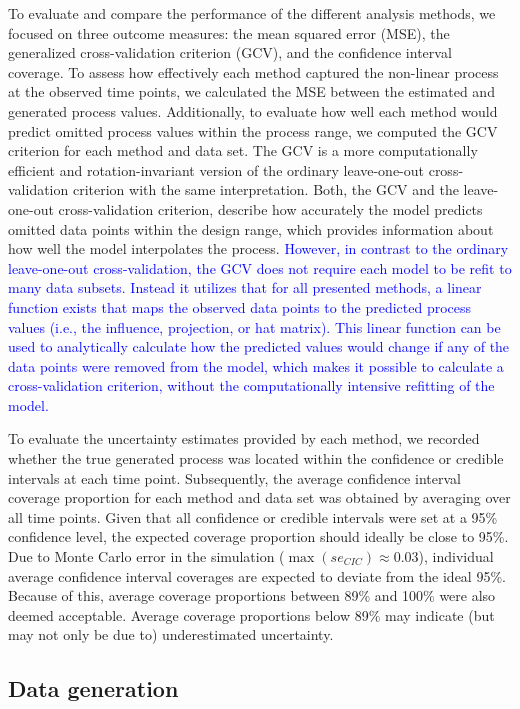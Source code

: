 \documentclass[man, floatsintext]{apa7}
\begin{document}
To evaluate and compare the performance of the different analysis methods, we
focused on three outcome measures: the mean squared error (MSE), the
generalized cross-validation criterion (GCV), and the confidence interval
coverage. To assess how effectively each method captured the non-linear process
at the observed time points, we calculated the MSE between the estimated and
generated process values. Additionally, to evaluate how well each method would
predict omitted process values within the process range, we computed the GCV
\parencite{golub_generalized_1979} criterion for each method and data set. The
GCV is a more computationally efficient and rotation-invariant version of the
ordinary leave-one-out cross-validation criterion with the same interpretation.
Both, the GCV and the leave-one-out cross-validation criterion, describe how
accurately the model predicts omitted data points within the design range,
which provides information about how well the model interpolates the process.
\textcolor{blue}{However, in contrast to the ordinary leave-one-out
  cross-validation, the GCV does not require each model to be refit to many
  data
  subsets. Instead it utilizes that for all presented methods, a linear
  function
  exists that maps the observed data points to the predicted process values
  (i.e., the influence, projection, or hat matrix). This linear function can be
  used to analytically calculate how the predicted values would change if any
  of
  the data points were removed from the model, which makes it possible to
  calculate a cross-validation criterion, without the computationally intensive
  refitting of the model.}

To evaluate the uncertainty estimates provided by each method, we recorded
whether the true generated process was located within the confidence or
credible intervals at each time point. Subsequently, the average confidence
interval coverage proportion for each method and data set was obtained by
averaging over all time points. Given that all confidence or credible intervals
were set at a 95\% confidence level, the expected coverage proportion should
ideally be close to 95\%. Due to Monte Carlo error in the simulation
($\max(se_{CIC}) \approx 0.03$), individual average confidence interval
coverages are expected to deviate from the ideal 95\%. Because of this, average
coverage proportions between 89\% and 100\% were also deemed acceptable.
Average coverage proportions below 89\% may indicate (but may not only be due
to) underestimated uncertainty.

\subsection{Data generation}
\end{document}
